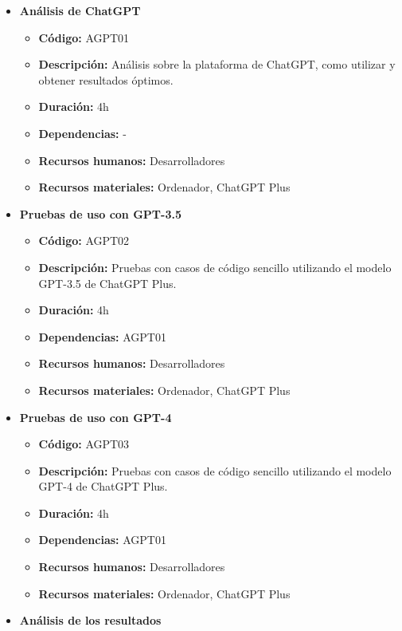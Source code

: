 \begin{itemize}
    \item \textbf{Análisis de ChatGPT}
        \begin{itemize}
            \item \textbf{Código:} AGPT01
            \item \textbf{Descripción:} Análisis sobre la plataforma de ChatGPT, como utilizar y obtener resultados óptimos.
            \item \textbf{Duración:} 4h
            \item \textbf{Dependencias:} -
            \item \textbf{Recursos humanos:} Desarrolladores
            \item \textbf{Recursos materiales:} Ordenador, ChatGPT Plus
        \end{itemize}
    \item \textbf{Pruebas de uso con GPT-3.5}
        \begin{itemize}
            \item \textbf{Código:} AGPT02
            \item \textbf{Descripción:} Pruebas con casos de código sencillo utilizando el modelo GPT-3.5 de ChatGPT Plus.
            \item \textbf{Duración:} 4h
            \item \textbf{Dependencias:} AGPT01
            \item \textbf{Recursos humanos:} Desarrolladores
            \item \textbf{Recursos materiales:} Ordenador, ChatGPT Plus
        \end{itemize}
    \item \textbf{Pruebas de uso con GPT-4}
        \begin{itemize}
            \item \textbf{Código:} AGPT03
            \item \textbf{Descripción:} Pruebas con casos de código sencillo utilizando el modelo GPT-4 de ChatGPT Plus.
            \item \textbf{Duración:} 4h
            \item \textbf{Dependencias:} AGPT01
            \item \textbf{Recursos humanos:} Desarrolladores
            \item \textbf{Recursos materiales:} Ordenador, ChatGPT Plus
        \end{itemize}
    \item \textbf{Análisis de los resultados}

\end{itemize}
